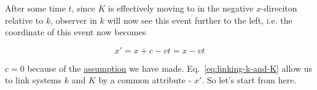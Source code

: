 
After some time $t$, since $K$ is effectively moving to in the negative $x$-direciton relative to $k$, observer in $k$
will now see this event further to the left, i.e. the coordinate of this event now becomes

\begin{equation}\label{eq:linking-k-and-K}
    x' = x + c - vt = x - vt
\end{equation}

$c = 0$ because of the \hyperlink{same-origin-assumption}{assumption} we have made. Eq.~\ref{eq:linking-k-and-K} allow
us to link systems $k$ and $K$ by a common attribute - $x'$. So let's start from here.


